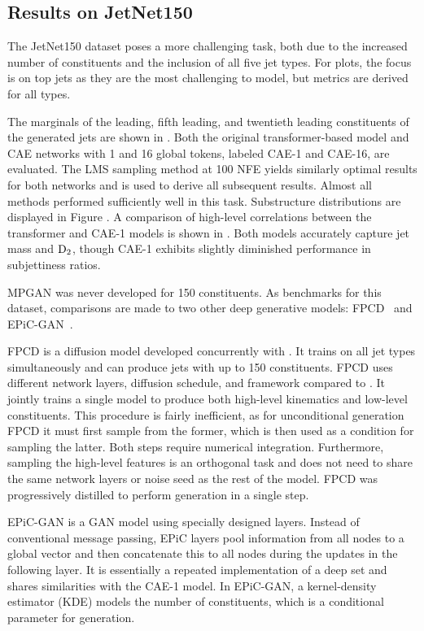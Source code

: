\FloatBarrier

\subsection{Results on JetNet150}

The JetNet150 dataset poses a more challenging task, both due to the increased number of constituents and the inclusion of all five jet types.
For plots, the focus is on top jets as they are the most challenging to model, but metrics are derived for all types.

The marginals of the leading, fifth leading, and twentieth leading constituents of the generated jets are shown in .
Both the original transformer-based model and CAE networks with 1 and 16 global tokens, labeled CAE-1 and CAE-16, are evaluated.
The LMS sampling method at 100 NFE yields similarly optimal results for both networks and is used to derive all subsequent results.
Almost all methods performed sufficiently well in this task.
Substructure distributions are displayed in Figure .
A comparison of high-level correlations between the transformer and CAE-1 models is shown in .
Both models accurately capture jet mass and $\text{D}_2$, though CAE-1 exhibits slightly diminished performance in subjettiness ratios.

MPGAN was never developed for 150 constituents.
As benchmarks for this dataset, comparisons are made to two other deep generative models: FPCD~\cite{FPCD} and EPiC-GAN~\cite{EPICGAN}.

FPCD is a diffusion model developed concurrently with \pcdroid.
It trains on all jet types simultaneously and can produce jets with up to 150 constituents.
FPCD uses different network layers, diffusion schedule, and framework compared to \pcdroid. It jointly trains a single model to produce both high-level kinematics and low-level constituents.
This procedure is fairly inefficient, as for unconditional generation FPCD it must first sample from the former, which is then used as a condition for sampling the latter.
Both steps require numerical integration.
Furthermore, sampling the high-level features is an orthogonal task and does not need to share the same network layers or noise seed as the rest of the model.
FPCD was progressively distilled to perform generation in a single step.

EPiC-GAN is a GAN model using specially designed layers.
Instead of conventional message passing, EPiC layers pool information from all nodes to a global vector and then concatenate this to all nodes during the updates in the following layer.
It is essentially a repeated implementation of a deep set and shares similarities with the CAE-1 model.
In EPiC-GAN, a kernel-density estimator (KDE) models the number of constituents, which is a conditional parameter for generation.

